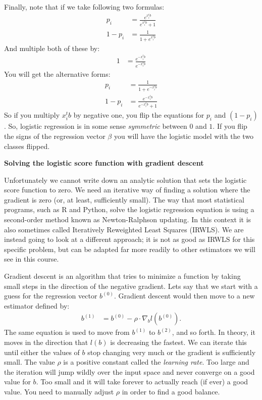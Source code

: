 \documentclass[12pt,hidelinks]{article}
\numberwithin{equation}{section}
\begin{document}
Finally, note that if we take following two formulas:
\begin{align*}
p_i &= \frac{e^{x_i^t b}}{e^{x_i^t b} + 1} \\
1 - p_i &= \frac{1}{1 + e^{x_i^t b}}
\end{align*}
And multiple both of these by:
\begin{align*}
1 &= \frac{e^{-x_i^t b}}{e^{-x_i^t b}}
\end{align*}
You will get the alternative forms:
\begin{align*}
p_i &= \frac{1}{1 + e^{-x_i^t b}} \\
1 - p_i &= \frac{e^{-x_i^t b}}{e^{-x_i^t b} + 1}
\end{align*}
So if you multiply $x_i^t b$ by negative one, you flip the equations for $p_i$
and $(1 - p_i)$. So, logistic regression is in some sense \textit{symmetric}
between $0$ and $1$. If you flip the signs of the regression vector $\beta$
you will have the logistic model with the two classes flipped.

\textbf{Solving the logistic score function with gradient descent}

Unfortunately we cannot write down an analytic solution that sets the
logistic score function to zero. We need an iterative way of finding a solution
where the gradient is zero (or, at least, sufficiently small). The way that
most statistical programs, such as R and Python, solve the logistic regression
equation is using a second-order method known as Newton-Ralphson updating. In
this context it is also sometimes called Iteratively Reweighted Least Squares
(IRWLS). We are instead going to look at a different approach; it is not as
good as IRWLS for this specific problem, but can be adapted far more readily
to other estimators we will see in this course.

Gradient descent is an algorithm that tries to minimize a function by taking
small steps in the direction of the negative gradient. Lets say that we start
with a guess for the regression vector $b^{(0)}$. Gradient descent would then
move to a new estimator defined by:
\begin{align}
b^{(1)} &= b^{(0)} - \rho \cdot \nabla_b l(b^{(0)}).
\end{align}
The same equation is used to move from $b^{(1)}$ to $b^{(2)}$, and so forth.
In theory, it moves in the direction that $l(b)$ is decreasing the fastest. We
can iterate this until either the values of $b$ stop changing very much or the
gradient is sufficiently small. The value $\rho$ is a positive constant called
the \textit{learning rate}. Too large and the iteration will jump wildly over
the input space and never converge on a good value for $b$. Too small and it
will take forever to actually reach (if ever) a good value. You need to
manually adjust $\rho$ in order to find a good balance.
\end{document}
